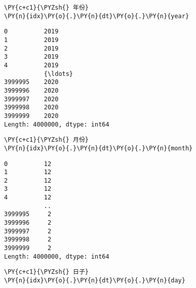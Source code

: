    \begin{tcolorbox}[breakable, size=fbox, boxrule=1pt, pad at break*=1mm,colback=cellbackground, colframe=cellborder]
\begin{Verbatim}[commandchars=\\\{\}]
\PY{c+c1}{\PYZsh{} 年份}
\PY{n}{idx}\PY{o}{.}\PY{n}{dt}\PY{o}{.}\PY{n}{year}
\end{Verbatim}
\end{tcolorbox}

            \begin{tcolorbox}[breakable, size=fbox, boxrule=.5pt, pad at break*=1mm, opacityfill=0]
\begin{Verbatim}[commandchars=\\\{\}]
0          2019
1          2019
2          2019
3          2019
4          2019
           {\ldots}
3999995    2020
3999996    2020
3999997    2020
3999998    2020
3999999    2020
Length: 4000000, dtype: int64
\end{Verbatim}
\end{tcolorbox}
        
    \begin{tcolorbox}[breakable, size=fbox, boxrule=1pt, pad at break*=1mm,colback=cellbackground, colframe=cellborder]
\begin{Verbatim}[commandchars=\\\{\}]
\PY{c+c1}{\PYZsh{} 月份}
\PY{n}{idx}\PY{o}{.}\PY{n}{dt}\PY{o}{.}\PY{n}{month}
\end{Verbatim}
\end{tcolorbox}

            \begin{tcolorbox}[breakable, size=fbox, boxrule=.5pt, pad at break*=1mm, opacityfill=0]
\begin{Verbatim}[commandchars=\\\{\}]
0          12
1          12
2          12
3          12
4          12
           ..
3999995     2
3999996     2
3999997     2
3999998     2
3999999     2
Length: 4000000, dtype: int64
\end{Verbatim}
\end{tcolorbox}
        
    \begin{tcolorbox}[breakable, size=fbox, boxrule=1pt, pad at break*=1mm,colback=cellbackground, colframe=cellborder]
\begin{Verbatim}[commandchars=\\\{\}]
\PY{c+c1}{\PYZsh{} 日子}
\PY{n}{idx}\PY{o}{.}\PY{n}{dt}\PY{o}{.}\PY{n}{day}
\end{Verbatim}
\end{tcolorbox}

